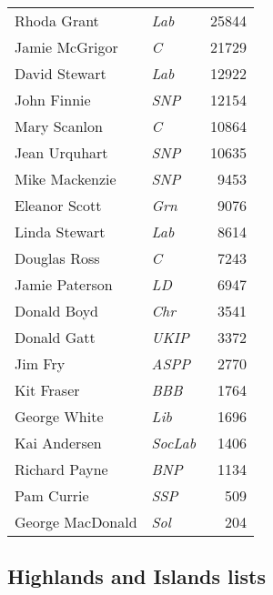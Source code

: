 {\footnotesize
\begin{tabular*}{\columnwidth}{@{\extracolsep{\fill}} p{} >{\itshape}l r @{\extracolsep{\fill}}}
Rhoda Grant & Lab & 25844\\%
Jamie McGrigor & C & 21729\\%
David Stewart & Lab & 12922\\%
John Finnie & SNP & 12154\\%
Mary Scanlon & C & 10864\\%
Jean Urquhart & SNP & 10635\\%
Mike Mackenzie & SNP & 9453\\%
\hline
Eleanor Scott & Grn & 9076\\
Linda Stewart & Lab & 8614\\
Douglas Ross & C & 7243\\
Jamie Paterson & LD & 6947\\
Donald Boyd & Chr & 3541\\
Donald Gatt & UKIP & 3372\\
Jim Fry & ASPP & 2770\\
Kit Fraser & BBB & 1764\\
George White & Lib & 1696\\
Kai Andersen & SocLab & 1406\\
Richard Payne & BNP & 1134\\
Pam Currie & SSP & 509\\
George MacDonald & Sol & 204\\
\end{tabular*}

}

\vfill

\subsection*{Highlands and Islands lists}

